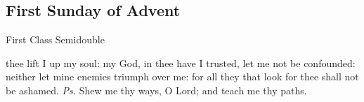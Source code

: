 	\fancyhead[RO,LE]{}
	\fancyhead[RE,LO]{}
	
{}

   \subsection{First Sunday of Advent}\label{AdventI}
\begin{inhead}
    {First Class Semidouble}
\end{inhead}


\introit
{} thee lift I up my soul: my God, in thee have I trusted, let me not be confounded: neither let mine enemies triumph over me: for all they that look for thee shall not be ashamed. \textit{Ps.} Shew me thy ways, O Lord; and teach me thy paths.


